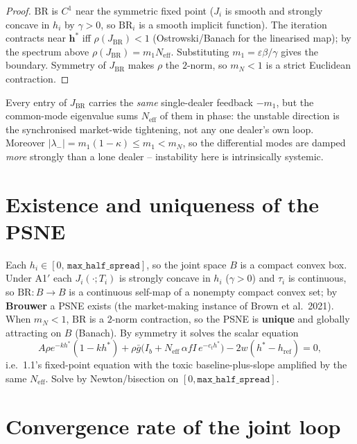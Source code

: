 \documentclass[11pt]{article}
\newcommand{\eps}{\varepsilon}
\newcommand{\gbar}{\bar g}
\newcommand{\hrefp}{h_{\mathrm{ref}}}
\newcommand{\code}[1]{\texttt{#1}}
\newcommand{\BR}{\mathrm{BR}}
\newcommand{\Neff}{N_{\mathrm{eff}}}
\newcommand{\bvh}{\bm{h}}
\begin{document}
\begin{proof}
$\BR$ is $C^1$ near the symmetric fixed point ($J_i$ is smooth and strongly concave
in $h_i$ by $\gamma>0$, so $\BR_i$ is a smooth implicit function). The iteration
contracts near $\bvh^*$ iff $\rho(J_{\BR})<1$ (Ostrowski/Banach for the linearised
map); by the spectrum above $\rho(J_{\BR})=m_1\Neff$. Substituting $m_1=\eps\beta/\gamma$
gives the boundary. Symmetry of $J_{\BR}$ makes $\rho$ the $2$-norm, so $m_N<1$ is a
strict Euclidean contraction.
\end{proof}

Every entry of $J_{\BR}$ carries the \emph{same} single-dealer feedback $-m_1$, but
the common-mode eigenvalue sums $\Neff$ of them in phase: the unstable direction is
the synchronised market-wide tightening, not any one dealer's own loop. Moreover
$|\lambda_-|=m_1(1-\kappa)\le m_1<m_N$, so the differential modes are damped
\emph{more} strongly than a lone dealer -- instability here is intrinsically systemic.

\section{Existence and uniqueness of the PSNE}

Each $h_i\in[0,\,\code{max\_half\_spread}]$, so the joint space $B$ is a compact
convex box. Under A1$'$ each $J_i(\cdot;T_i)$ is strongly concave in $h_i$
($\gamma>0$) and $\tau_i$ is continuous, so $\BR:B\to B$ is a continuous self-map of
a nonempty compact convex set; by \textbf{Brouwer} a PSNE exists (the market-making
instance of Brown et al.\ 2021). When $m_N<1$, $\BR$ is a $2$-norm contraction, so
the PSNE is \textbf{unique} and globally attracting on $B$ (Banach). By symmetry it
solves the scalar equation
%
\begin{equation*}
  A\rho e^{-kh^*}(1-kh^*) + \rho\gbar\big(I_b + \Neff\,\alpha f I\,e^{-c_t h^*}\big)
   - 2w(h^*-\hrefp) = 0,
\end{equation*}
%
i.e.\ 1.1's fixed-point equation with the toxic baseline-plus-slope amplified by the
same $\Neff$. Solve by Newton/bisection on $[0,\code{max\_half\_spread}]$.

\section{Convergence rate of the joint loop}
\end{document}

